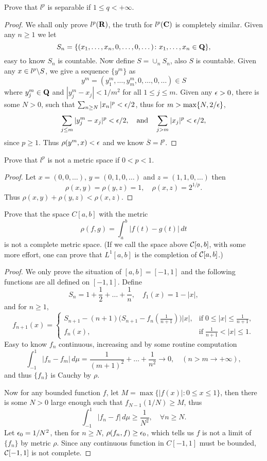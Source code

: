 \begin{pro}%
	Prove that $l^p$ is separable if $1\leq q<+\infty$.
\end{pro}
\begin{proof}
	We shall only prove $l^p(\mathbf{R})$, the truth for $l^p(\mathbf{C})$ is completely similar. Given any $n\geq 1$ we let 
	\[S_n=\{(x_1,\dots,x_n,0,\dots,0,\dots)\colon x_1,\dots,x_n\in \mathbf{Q}\},\]
	easy to know $S_n$ is countable. Now define $S=\cup_n S_n$, also $S$ is countable. Given any $x\in l^p\backslash S$, we give a sequence $\{y^m\}$ as 
	\[y^m=(y_1^m,\dots,y_m^m,0,\dots,0,\dots)\in S\]
	where $y_j^m\in \mathbf{Q}$ and $|y_j^m-x_j|<1/m^2$ for all $1\leq j\leq m$. Given any $\epsilon>0$, there is some $N>0$, such that $\sum_{n\geq N} |x_n|^p<\epsilon/2$, thus for $m>\max\{N,2/\epsilon\}$,
	\[\sum_{j\leq m} |y_j^m-x_j|^p<\epsilon/2,\quad\mbox{and}\quad \sum_{j>m} |x_j|^p<\epsilon/2,\]
	since $p\geq 1$. Thus $\rho(y^m,x)<\epsilon$ and we know $\overline{S}=l^p$.
\end{proof}

\begin{pro}%
	Prove that $l^p$ is not a metric space if $0<p<1$.
\end{pro}
\begin{proof}
	Let $x=(0,0,\dots)$, $y=(0,1,0,\dots)$ and $z=(1,1,0,\dots)$ then 
	\[\rho(x,y)=\rho(y,z)=1,\quad \rho(x,z)=2^{1/p}.\]
	Thus $\rho(x,y)+\rho(y,z)<\rho(x,z)$.
\end{proof}

\begin{pro}%
	Prove that the space $C[a,b]$ with the metric 
	\[\rho(f,g)=\int_a^b |f(t)-g(t)|\,dt\]
	is not a complete metric space. (If we call the space above $\mathcal{C}[a,b]$, with some more effort, one can prove that $L^1[a,b]$ is the completion of $\mathcal{C}[a,b]$.)
\end{pro}
\begin{proof}
	We only prove the situation of $[a,b]=[-1,1]$ and the following functions are all defined on $[-1,1]$. Define 
	\[S_n=1+\frac{1}{2}+\dots+\frac{1}{n},\quad f_1(x)=1-|x|,\]
	and for $n\geq 1$,
	\[f_{n+1}(x)=
	\begin{cases}
		S_{n+1}-(n+1)\big(S_{n+1}-f_n(\frac{1}{n+1})\big)|x|,&\mbox{if}\;0\leq |x|\leq \frac{1}{n+1},\\
		f_n(x),&\mbox{if}\;\frac{1}{n+1}<|x|\leq 1.
	\end{cases}\]
	Easy to know $f_n$ continuous, increasing and by some routine computation
	\[\int_{-1}^1|f_n-f_m|\,d\mu=\frac{1}{(m+1)^2}+\dots+\frac{1}{n^2}\to 0,\quad (n>m\to+\infty),\]
	and thus $\{f_n\}$ is Cauchy by $\rho$.

	Now for any bounded function $f$, let $M=\max\{|f(x)|\colon 0\leq x\leq 1\}$, then there is some $N>0$ large enough such that $f_{N-1}(1/N)\geq M$, thus
	\[\int_{-1}^1 |f_n-f|\,d\mu\geq \frac{1}{N^2},\quad \forall n\geq N.\]
	Let $\epsilon_0=1/N^2$, then for $n\geq N$, $\rho(f_n,f)\geq \epsilon_0$, which tells us $f$ is not a limit of $\{f_n\}$ by metric $\rho$. Since any continuous function in $C[-1,1]$ must be bounded, $\mathcal{C}[-1,1]$ is not complete.
\end{proof}

